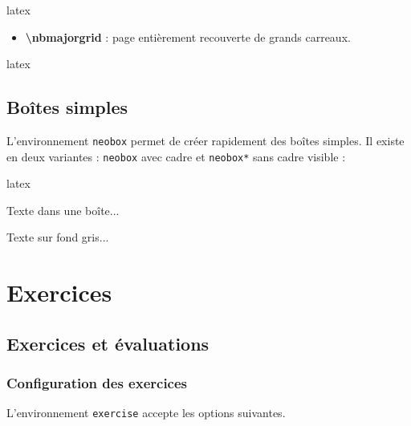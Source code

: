 \documentclass[
    french,
    margin=2cm
]{neoschool}
\begin{document}
\begin{code}{latex}
\nbminorgrid  %
\end{code}

\begin{itemize}
\item \textbf{\textbackslash nbmajorgrid} : page entièrement recouverte de grands carreaux.
\end{itemize}

\begin{code}{latex}
\nbmajorgrid  %
\end{code}

\subsection{Boîtes simples}

L'environnement \texttt{neobox} permet de créer rapidement des boîtes simples. Il existe en deux variantes : \texttt{neobox} avec cadre et \texttt{neobox*} sans cadre visible :

\begin{code}{latex}
\begin{neobox}[colframe=blue,colback=blue!5]
    Texte dans une boîte...
\end{neobox}

\begin{neobox*}[colback=gray!10]
    Texte sur fond gris...
\end{neobox*}
\end{code}

\section{Exercices}

\subsection{Exercices et évaluations}

\subsubsection{Configuration des exercices}

L'environnement \texttt{exercise} accepte les options
suivantes.
\end{document}
